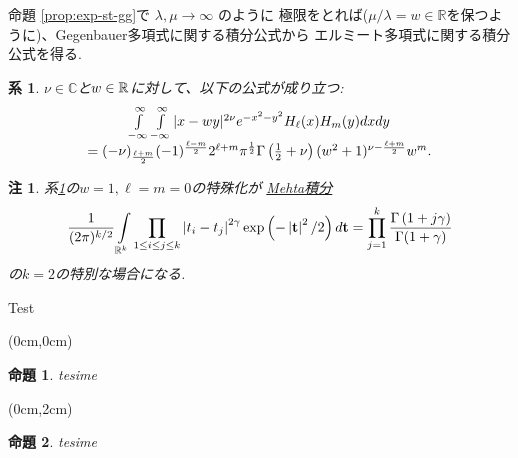 \documentclass[pdf,notes]{beamer}
\newtheorem{prop}{命題}
\newtheorem{remark}{注}
\newtheorem{cor}{系}
\begin{document}
\begin{frame}
	命題 \ref{prop:exp-st-gg}で $\lambda,\mu\to\infty$ のように
	極限をとれば($\mu/\lambda=w\in\mathbb{R}$を保つように)、Gegenbauer多項式に関する積分公式から
	エルミート多項式に関する積分公式を得る.
	\begin{cor}\label{cor:int-xzy-hh}
		$\nu\in\mathbb{C}$と$w\in\mathbb{R}$に対して、以下の公式が成り立つ:
		\begin{equation*}
			\begin{array}[]{c}
			\int_{- \infty}^{\infty} \int_{- \infty}^{\infty} | x - w y |^{2 \nu} e^{-
			x^2 - y^2} H_\ell (x) H_m (y) d x d y \\= (- \nu)_{\frac{\ell + m}{2}} (- 1)^{\frac{\ell
			- m}{2}} 2^{\ell + m} \pi^{\frac{1}{2}} \Gamma \left( \frac{1}{2} + \nu \right)
			(w^2 + 1)^{\nu - \frac{\ell + m}{2}} w^m .
			\end{array}
		\end{equation*}
	\end{cor}
	\pause
	\vspace{-0.2cm}
	\begin{remark}
		系\ref{cor:int-xzy-hh}の$w=1,\ell=m=0$の特殊化が
		\underline{Mehta積分}
	\vspace{-0.3cm}
		\begin{equation*}
			\frac{1}{(2\pi)^{k/2}}\int_{\mathbb{R}^k}\prod_{1\le i\le j\le k}\myabs{t_i-t_j}^{2\gamma}\exp\left( -\myabs{\mathbf{t}}^2/2 \right)d\mathbf{t}=\prod_{j=1}^k\frac{\Gamma\left( 
			1+j\gamma\right)}{\Gamma(1+\gamma)}
	\vspace{-0.4cm}
		\end{equation*}
		の$k=2$の特別な場合になる.
	\end{remark}
\end{frame}
\begin{frame}{Test}
	\begin{textblock*}{10cm}(0cm,0cm)
		\begin{prop}
			tesime
		\end{prop}
	\end{textblock*}
	\begin{textblock*}{10cm}(0cm,2cm)
		\begin{prop}
			tesime
		\end{prop}
	\end{textblock*}
\end{frame}
\end{document}

